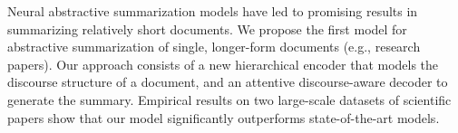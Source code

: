 Neural abstractive summarization models have led to promising results in summarizing relatively short documents. We propose the first model for abstractive summarization of single, longer-form documents (e.g., research papers). Our approach consists of a new hierarchical encoder that models the discourse structure of a document, and an attentive discourse-aware decoder to generate the summary. Empirical results on two large-scale datasets of scientific papers show that our model significantly outperforms state-of-the-art models.
